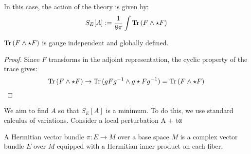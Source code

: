 In this case, the action of the theory is given by:
\[
	S_E[A] := \frac{1}{8\pi} \int \mathrm{Tr}\,(F \wedge \star F)
\]
\begin{prop}
	$\mathrm{Tr}\,(F \wedge \star F)$ is gauge independent and globally defined.
\end{prop}
\begin{proof}
	Since $F$ transforms in the adjoint representation, the cyclic property of the trace gives:
	\[
		\mathrm{Tr}\,(F \wedge \star F) \to \mathrm{Tr}\,(g F g^{-1} \wedge g \star F g^{-1}) = \mathrm{Tr}\,(F \wedge \star F)
	\]
\end{proof}
We aim to find $A$ so that $S_E[A]$ is a minimum. To do this, we use standard calculus of variations. Consider a local perturbation A + tα



\begin{defn}
	A Hermitian vector bundle $\pi: E \to M$ over a base space $M$ is a complex vector bundle $E$ over $M$ equipped with a Hermitian inner product on each fiber.
\end{defn}

\begin{defn}
	
\end{defn}

